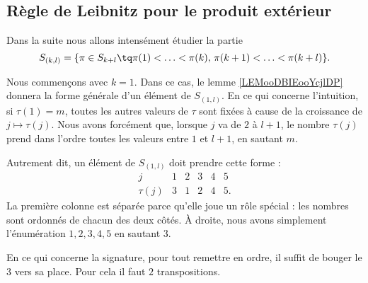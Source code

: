 \subsection{Règle de Leibnitz pour le produit extérieur}

Dans la suite nous allons intensément étudier la partie
\begin{equation}
	S_{(k,l)}=\{ \pi\in S_{k+l}\tq \pi(1)<\ldots <\pi(k),\,\pi(k+1)<\ldots <\pi(k+l) \}.
\end{equation}

Nous commençons avec \( k=1\). Dans ce cas, le lemme \ref{LEMooDBIEooYcjlDP} donnera la forme générale d'un élément de \( S_{(1,l)}\). En ce qui concerne l'intuition, si \( \tau(1)=m\), toutes les autres valeurs de \( \tau\) sont fixées à cause de la croissance de \( j\mapsto \tau(j)\). Nous avons forcément que, lorsque \( j\) va de \( 2\) à \( l+1\), le nombre \( \tau(j)\) prend dans l'ordre toutes les valeurs entre \( 1\) et \( l+1\), en sautant \( m\).

Autrement dit, un élément de \( S_{(1,l)}\) doit prendre cette forme :
\begin{equation}
	\begin{array}{cc|cccc}
		j       & 1 & 2 & 3 & 4 & 5  \\
		\tau(j) & 3 & 1 & 2 & 4 & 5.
	\end{array}
\end{equation}
La première colonne est séparée parce qu'elle joue un rôle spécial : les nombres sont ordonnés de chacun des deux côtés. À droite, nous avons simplement l'énumération \( 1,2,3,4,5\) en sautant \( 3\).

En ce qui concerne la signature, pour tout remettre en ordre, il suffit de bouger le \( 3\) vers sa place. Pour cela il faut \( 2\) transpositions.


